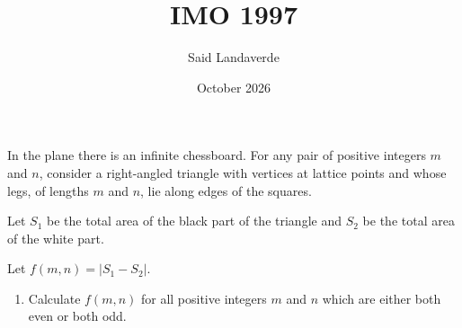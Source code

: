 \documentclass{article}
\title{IMO 1997}
\author{Said Landaverde}
\date{October 2026}
\begin{document}
\maketitle


\vspace{0.5cm}

{\large
In the plane there is an infinite chessboard.
For any pair of positive integers $m$ and $n$,
consider a right-angled triangle with vertices at lattice points
and whose legs, of lengths $m$ and $n$, lie along edges of the squares.

Let $S_1$ be the total area of the black part of the triangle
and $S_2$ be the total area of the white part.

Let $f(m,n)=|S_1-S_2|$.

\begin{enumerate}
    \item[(a)] Calculate $f(m,n)$ for all positive integers
    $m$ and $n$ which are either both even or both odd.
\end{enumerate}
}

\vspace{1cm}
\end{document}
